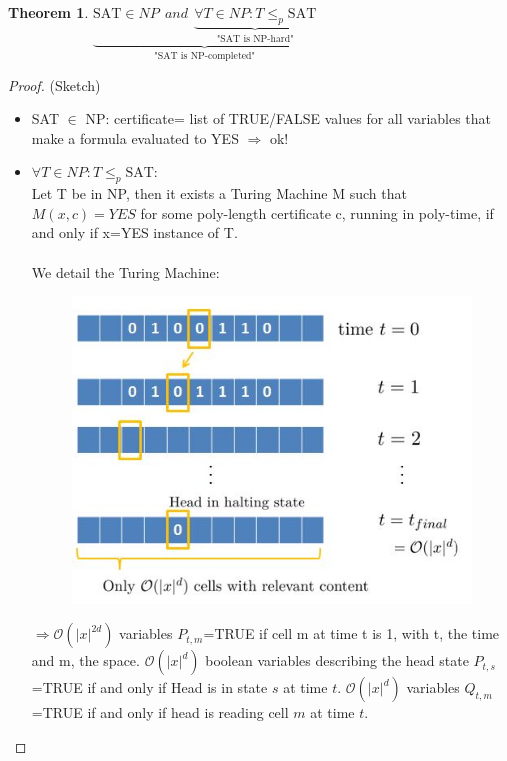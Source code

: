 \documentclass[11pt]{report}
\newtheorem{theorem}{Theorem}[section]
\theoremstyle{definition}
\theoremstyle{remark}
\begin{document}
\begin{theorem}
$\underbrace{\text{SAT} \in NP \ \ and \ \ \underbrace{\forall T \in NP: T \leq_p \text{SAT}}_{\text{"SAT is NP-hard"}}}_{\text{"SAT is NP-completed"}}$
\end{theorem}

\begin{proof}
(Sketch) 
\begin{itemize}
\item SAT $\in$ NP: certificate= list of TRUE/FALSE values for all variables that make a formula evaluated to YES $\Rightarrow$ ok!
\item  $\forall T \in NP: T \leq_p \text{SAT}$: \\ Let T be in NP, then it exists a Turing Machine M such that $M(x,c)=YES$ for some poly-length certificate c, running in poly-time, if and only if x=YES instance of T. 
\paragraph{} We detail the Turing Machine: \\ 

\begin{figure}[h!]
\centering
\includegraphics[scale=0.7]{fig_2.jpg}
\end{figure}

 $\Rightarrow \mathcal{O}\left( \vert x \vert^{2d} \right)$ variables $P_{t,m}$=TRUE if cell m at time t is 1, with t, the time and m, the space. $\mathcal{O}\left( \vert x \vert^{d} \right)$ boolean variables describing the head state $P_{t,s}$=TRUE if and only if Head is in state $s$ at time $t$. $\mathcal{O}\left( \vert x \vert^{d} \right)$ variables $Q_{t,m}$=TRUE if and only if head is reading cell $m$ at time $t$. 
 

\end{itemize}
\end{proof}
\end{document}

